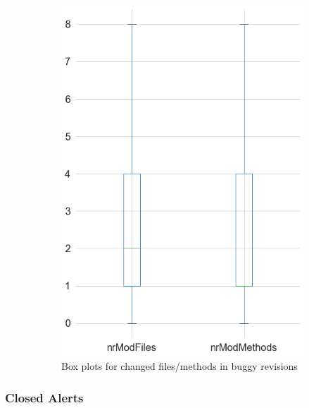 \begin{figure}[H]
\begin{subfigure}{0.5\textwidth}
		\includegraphics[scale=0.3]{./src/data_analysis/buggy_box_files.png}
		\caption{Box plots for changed files/methods in buggy revisions}
	\end{subfigure}
	\caption{}
	\label{box:changed_files}
\end{figure}

\newpage
\subsubsection{Closed Alerts}

